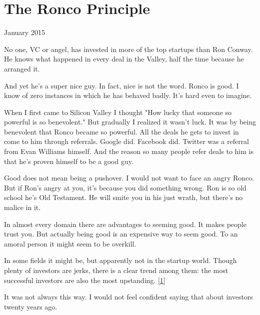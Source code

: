 \chapter{The Ronco Principle}


            
              
                

January 2015

No one, VC or angel, has invested in
                  more of the top startups than Ron Conway. He knows what
                  happened in every deal in the Valley, half the time because he
                  arranged it.

And yet he's a super nice guy. In
                  fact, nice is not the word. Ronco is good. I know of zero
                  instances in which he has behaved badly. It's hard even to
                  imagine.

When I first came to Silicon Valley I
                  thought "How lucky that someone so powerful is so benevolent."
                  But gradually I realized it wasn't luck. It was by being
                  benevolent that Ronco became so powerful. All the deals he
                  gets to invest in come to him through referrals. Google did.
                  Facebook did. Twitter was a referral from Evan Williams
                  himself. And the reason so many people refer deals to him is
                  that he's proven himself to be a good guy.

Good
                  does not mean being a pushover. I would not want to face an
                  angry Ronco. But if Ron's angry at you, it's because you did
                  something wrong. Ron is so old school he's Old Testament. He
                  will smite you in his just wrath, but there's no malice in
                  it.

In almost every domain there are advantages to
                  seeming good. It makes people trust you. But actually being
                  good is an expensive way to seem good. To an amoral person it
                  might seem to be overkill.

In some fields it might
                  be, but apparently not in the startup world. Though plenty of
                  investors are jerks, there is a clear trend among them: the
                  most successful investors are also the most upstanding.
                  [\href{\#f1n}{1}]

It was not always this way. I would not feel
                  confident saying that about investors twenty years ago.

